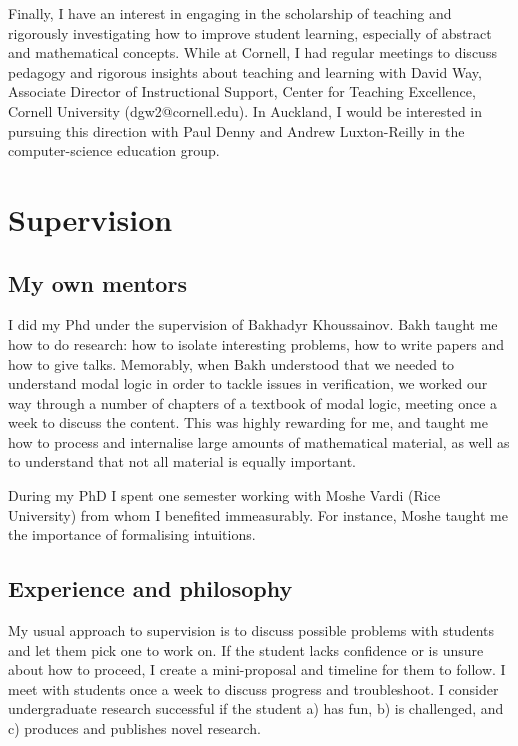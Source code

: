 \documentclass[10,a4paper,sans]{moderncv}
\begin{document}
Finally, I have an interest in engaging in the scholarship of teaching and rigorously investigating how to improve student learning, especially of 
abstract and mathematical concepts. While at Cornell, I had regular meetings to discuss pedagogy and rigorous insights about teaching and learning with 
David Way, Associate Director of Instructional Support, Center for Teaching Excellence, Cornell University (dgw2@cornell.edu). 
In Auckland, I would be interested in pursuing this direction with Paul Denny and Andrew Luxton-Reilly in the computer-science education group.
% 
% 
% 
% 
% 
% 


\section{Supervision}


\subsection{My own mentors}

I did my Phd under the supervision of Bakhadyr Khoussainov. Bakh taught me how to do research: how to isolate interesting problems, 
how to write papers and how to give talks. Memorably, when Bakh understood that we needed to understand modal logic 
in order to tackle issues in verification, we worked our way through a number of chapters of a textbook of modal logic, meeting 
once a week to discuss the content. This was highly rewarding for me, and taught me how to process and internalise large amounts of 
mathematical material, as well as to understand that not all material is equally important.

During my PhD I spent one semester working with Moshe Vardi (Rice University) from whom I benefited immeasurably. For instance, Moshe 
taught me the importance of formalising intuitions. 

\subsection{Experience and philosophy}
My usual approach to supervision is to discuss possible problems with students and let them pick one to work on. 
If the student lacks confidence or is unsure about how to proceed, I create a mini-proposal and timeline for them to follow. I meet with students once a week to discuss progress and troubleshoot. I consider undergraduate research successful if the student a) has fun, b) is challenged, and c) produces and publishes novel research.
\end{document}
